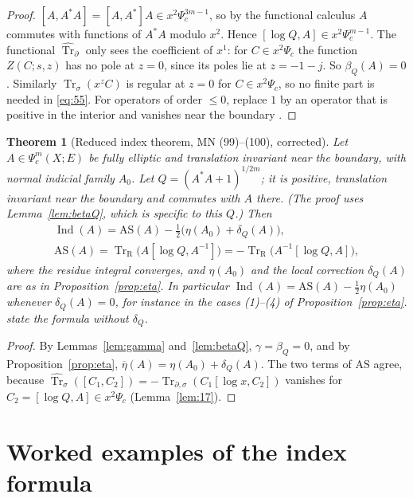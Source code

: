 \documentclass[11pt,oneside,reqno]{article}
\DeclareMathOperator{\Tr}{Tr}
\DeclareMathOperator{\Ind}{Ind}
\newcommand{\Psic}{\Psi_{c}}
\newcommand{\Trs}{\Tr_\sigma}
\newcommand{\Trds}{\Tr_{\partial,\sigma}}
\newcommand{\hTrs}{\widehat{\Tr}_\sigma}
\newcommand{\hTrd}{\widehat{\Tr}_\partial}
\newcommand{\TrR}{\Tr_{\mathrm R}}
\newcommand{\lQ}{\log Q}
\newcommand{\lx}{\log x}
\newcommand{\AS}{\mathrm{AS}}
\newcommand{\etab}{\overline\eta}
\theoremstyle{plain}
\newtheorem{theorem}{Theorem}[section]
\theoremstyle{definition}
\theoremstyle{remark}
\begin{document}
\begin{proof}
\([A,A^*A]=[A,A^*]A\in x^2\Psic^{3m-1}\), so by the functional calculus
\(A\) commutes with functions of \(A^*A\) modulo \(x^2\). Hence
\([\lQ,A]\in x^2\Psic^{m-1}\). The functional \(\hTrd\) only sees the
coefficient of \(x^1\): for \(C\in x^2\Psic\) the function \(Z(C;s,z)\)
has no pole at \(z=0\), since its poles lie at \(z=-1-j\). So
\(\beta_Q(A)=0\). Similarly \(\Trs(x^zC)\) is regular at \(z=0\) for
\(C\in x^2\Psic\), so no finite part is needed in \eqref{eq:55}. For
operators of order \(\le0\), replace \(1\) by an operator that is positive
in the interior and vanishes near the boundary \cite[p.~33]{MN}.
\end{proof}

\begin{theorem}[Reduced index theorem, MN (99)--(100), corrected]
\label{thm:reduced}
Let \(A\in\Psic^m(X;E)\) be fully elliptic and translation invariant near
the boundary, with normal indicial family \(A_0\). Let \(Q=(A^*A+1)^{1/2m}\); it is positive,
translation invariant near the boundary and commutes with \(A\) there.
(The proof uses Lemma~\ref{lem:betaQ}, which is specific to this \(Q\).)
Then
\begin{gather*}
 \Ind(A)=\AS(A)-\tfrac12\bigl(\eta(A_0)+\delta_Q(A)\bigr),\\
 \AS(A)=\TrR\bigl(A[\lQ,A^{-1}]\bigr)=-\TrR\bigl(A^{-1}[\lQ,A]\bigr),
\end{gather*}
where the residue integral converges, and \(\eta(A_0)\) and the local
correction \(\delta_Q(A)\) are as in Proposition~\ref{prop:eta}. In
particular \(\Ind(A)=\AS(A)-\frac12\eta(A_0)\) whenever \(\delta_Q(A)=0\),
for instance in the cases (1)--(4) of Proposition~\ref{prop:eta}.
\cite[(99)--(100)]{MN} state the formula without \(\delta_Q\).
\end{theorem}

\begin{proof}
By Lemmas~\ref{lem:gamma} and~\ref{lem:betaQ}, \(\gamma=\beta_Q=0\), and
by Proposition~\ref{prop:eta}, \(\etab(A)=\eta(A_0)+\delta_Q(A)\). The two terms of
\(\AS\) agree, because \(\hTrs([C_1,C_2])=-\Trds(C_1[\lx,C_2])\) vanishes
for \(C_2=[\lQ,A]\in x^2\Psic\) (Lemma~\ref{lem:17}).
\end{proof}

\section{Worked examples of the index formula}\label{sec:examples}
\end{document}
